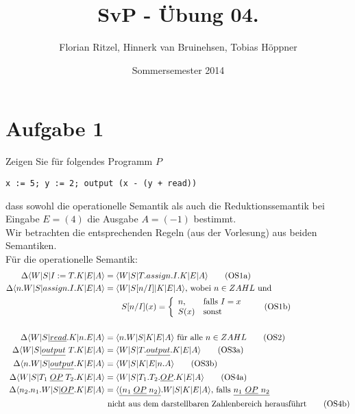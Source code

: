 \documentclass[ngerman,a4paper]{report}
\author{Florian Ritzel, Hinnerk van Bruinehsen, Tobias Höppner}
\title{SvP - Übung 04. }
\date{Sommersemester 2014}
\renewcommand{\maketitle}{}
\begin{document}
\maketitle
\section*{Aufgabe 1}
Zeigen Sie für folgendes Programm $P$
\begin{lstlisting}
x := 5; y := 2; output (x - (y + read))
\end{lstlisting}
dass sowohl die operationelle Semantik als auch die Reduktionssemantik bei Eingabe $E = (4)$ die Ausgabe $A = (-1)$ bestimmt.\\
Wir betrachten die entsprechenden Regeln (aus der Vorlesung) aus beiden Semantiken.\\
Für die operationelle Semantik:
\begin{align}
\Delta\langle W|S|I:=T.K|E|A\rangle &= \langle W|S|T.assign.I.K|E|A\rangle \tag{OS1a}\\
\Delta\langle n.W|S|assign.I.K|E|A\rangle &= \langle W|S[n/I]|K|E|A\rangle\text{, wobei }n\in ZAHL\text{ und } \notag\\&\quad\quad S[n/I](x) = \left\lbrace\begin{array}{l l}
n,&\text{falls }I =x\notag\\
	S(x)& \text{sonst}\notag\\
\end{array}\right.\tag{OS1b}\\\notag \\
\Delta\langle W|S|\underline{read}.K|n.E|A\rangle &= \langle n.W|S|K|E|A\rangle\text{ für alle }n\in ZAHL\tag{OS2}\\
\Delta\langle W|S|\underline{output}\ T.K|E|A\rangle &= \langle W|S|T.\underline{output}.K|E|A\rangle\tag{OS3a}\\
\Delta\langle n.W|S|\underline{output}.K|E|A\rangle &= \langle W|S|K|E|n.A\rangle\tag{OS3b}\\
\Delta\langle W|S|T_1\;\underline{OP}\;T_2.K|E|A\rangle &= \langle W|S|T_1.T_2.\underline{OP}.K|E|A\rangle\tag{OS4a}\\
\Delta\langle n_2.n_1.W|S|\underline{OP}.K|E|A\rangle &= \langle \underline{(n_1\;\underline{OP}\;n_2)}.W|S|K|E|A\rangle\text{, falls }\underline{n_1\ \underline{OP}\ n_2}\notag\\&\text{ nicht aus dem darstellbaren Zahlenbereich herausführt}\tag{OS4b}\\\notag
\end{align}
\end{document}
